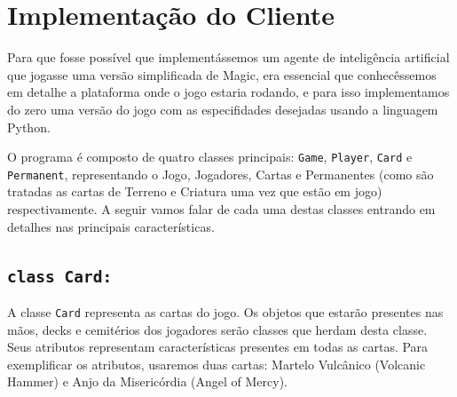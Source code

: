 \documentclass[dvipsnames]{book}
\begin{document}
\chapter{Implementação do Cliente}
Para que fosse possível que implementássemos um agente de inteligência artificial que
jogasse uma versão simplificada de Magic, era essencial que conhecêssemos em detalhe a
plataforma onde o jogo estaria rodando, e para isso implementamos do zero uma versão do
jogo com as especifidades desejadas usando a linguagem Python.

O programa é composto de quatro classes principais: \texttt{Game}, \texttt{Player}, \texttt{Card}
e \texttt{Permanent}, representando o Jogo, Jogadores, Cartas e Permanentes (como são tratadas as
cartas de Terreno e Criatura uma vez que estão em jogo) respectivamente. A seguir vamos falar de
cada uma destas classes entrando em detalhes nas principais características.

\section{\texttt{class Card:}}
A classe \texttt{Card} representa as cartas do jogo. Os objetos que estarão presentes nas mãos,
decks e cemitérios dos jogadores serão classes que herdam desta classe. Seus atributos representam
características presentes em todas as cartas. Para exemplificar os atributos, usaremos duas cartas:
Martelo Vulcânico (Volcanic Hammer) e Anjo da Misericórdia (Angel of Mercy).
\end{document}

